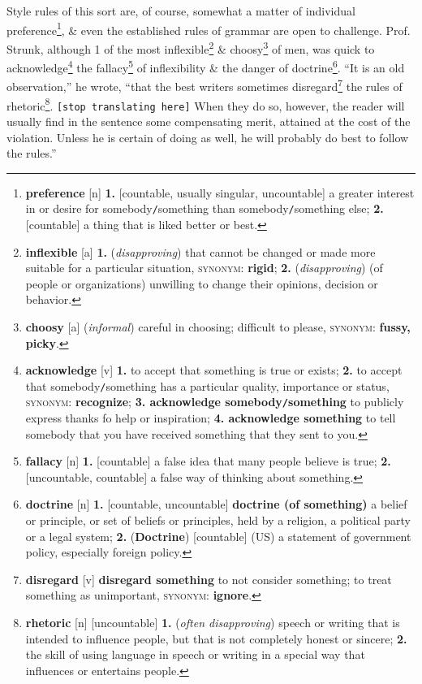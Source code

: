\documentclass{article}
\begin{document}
Style rules of this sort are, of course, somewhat a matter of individual preference\footnote{{\bf preference} [n] {\bf 1.} [countable, usually singular, uncountable] a greater interest in or desire for somebody{\tt/}something than somebody{\tt/}something else; {\bf 2.} [countable] a thing that is liked better or best.}, \& even the established rules of grammar are open to challenge. Prof. Strunk, although 1 of the most inflexible\footnote{{\bf inflexible} [a] {\bf 1.} ({\it disapproving}) that cannot be changed or made more suitable for a particular situation, \textsc{synonym}: {\bf rigid}; {\bf 2.} ({\it disapproving}) (of people or organizations) unwilling to change their opinions, decision or behavior.} \& choosy\footnote{{\bf choosy} [a] ({\it informal}) careful in choosing; difficult to please, \textsc{synonym}: {\bf fussy, picky}.} of men, was quick to acknowledge\footnote{{\bf acknowledge} [v]  {\bf 1.} to accept that something is true or exists; {\bf 2.} to accept that somebody{\tt/}something has a particular quality, importance or status, \textsc{synonym}: {\bf recognize}; {\bf 3. acknowledge somebody{\tt/}something} to publicly express thanks fo help or inspiration; {\bf 4. acknowledge something} to tell somebody that you have received something that they sent to you.} the fallacy\footnote{{\bf fallacy} [n] {\bf 1.} [countable] a false idea that many people believe is true; {\bf 2.} [uncountable, countable] a false way of thinking about something.} of inflexibility \& the danger of doctrine\footnote{{\bf doctrine} [n] {\bf 1.} [countable, uncountable] {\bf doctrine (of something)} a belief or principle, or set of beliefs or principles, held by a religion, a political party or a legal system; {\bf 2.} ({\bf Doctrine}) [countable] (US) a statement of government policy, especially foreign policy.}. ``It is an old observation,'' he wrote, ``that the best writers sometimes disregard\footnote{{\bf disregard} [v] {\bf disregard something} to not consider something; to treat something as unimportant, \textsc{synonym}: {\bf ignore}.} the rules of rhetoric\footnote{{\bf rhetoric} [n] [uncountable] {\bf 1.} ({\it often disapproving}) speech or writing that is intended to influence people, but that is not completely honest or sincere; {\bf 2.} the skill of using language in speech or writing in a special way that influences or entertains people.}. \texttt{[stop translating here]} When they do so, however, the reader will usually find in the sentence some compensating merit, attained at the cost of the violation. Unless he is certain of doing as well, he will probably do best to follow the rules.''
\end{document}
